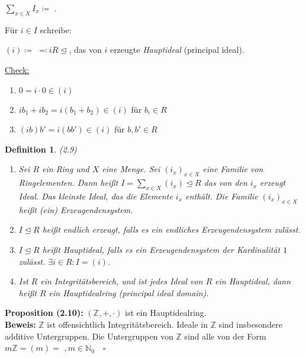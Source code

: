 \documentclass[10pt,a4paper]{article}
\newtheorem{defi}{Definition}
\begin{document}
$\sum_{x \in X} I_x \coloneqq$ .

Für $i \in I$ schreibe:

$(i) \coloneqq $  $\eqqcolon iR \trianglelefteq$, das von $i$ erzeugte \emph{Hauptideal} (principal ideal).

\underline{Check:}\begin{enumerate}
\item $0 = i \cdot 0 \in (i)$
\item $ib_1 + ib_2 = i(b_1 + b_2) \in (i)$ für $b_i \in R$
\item $(ib)b' = i (bb') \in (i)$ für $b, b' \in R$
\end{enumerate}

\begin{defi}(2.9)\begin{enumerate}
\item Sei $R$ ein Ring und $X$ eine Menge. Sei $(i_x)_{x \in X}$ eine Familie von Ringelementen. Dann heißt $I = \sum_{x \in X} (i_x) \trianglelefteq R$ das von den $i_x$ \emph{erzeugt Ideal}. Das kleinste Ideal, das die Elemente $i_x$ enthält. Die Familie $(i_x)_{x \in X}$ heißt (ein) \emph{Erzeugendensystem}.

\item $I \trianglelefteq R$ heißt \emph{endlich erzeugt}, falls es ein endliches Erzeugendensystem zulässt.

\item $I \trianglelefteq R$ heißt \emph{Hauptideal}, falls es ein Erzeugendensystem der Kardinalität $1$ zulässt. $\exists i \in R: I = (i)$.

\item Ist $R$ ein Integritätsbereich, und ist jedes Ideal von $R$ ein Hauptideal, dann heißt $R$ ein \emph{Hauptidealring} (principal ideal domain).
\end{enumerate}
\end{defi}

\textbf{Proposition (2.10):} $(\mathbb{Z}, +, \cdot )$ ist ein Hauptidealring.\\
\textbf{Beweis:} $\mathbb{Z}$ ist offensichtlich Integritätsbereich. Ideale in $\mathbb{Z}$ sind insbesondere additive Untergruppen. Die Untergruppen von $\mathbb{Z}$ sind alle von der Form $m\mathbb{Z} = (m) = $  $, m \in \mathbb{N}_0 \quad \square$\bigskip
\end{document}
